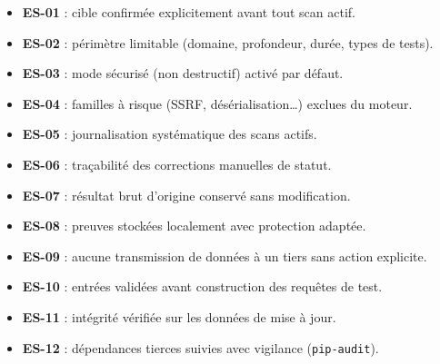 \documentclass[11pt,a4paper]{report}
\newcommand{\code}[1]{\texttt{#1}}
\begin{document}
\begin{itemize}[leftmargin=1.5em]
  \item \textbf{ES-01} : cible confirmée explicitement avant tout scan actif.
  \item \textbf{ES-02} : périmètre limitable (domaine, profondeur, durée, types de tests).
  \item \textbf{ES-03} : mode sécurisé (non destructif) activé par défaut.
  \item \textbf{ES-04} : familles à risque (SSRF, désérialisation\ldots) exclues du moteur.
  \item \textbf{ES-05} : journalisation systématique des scans actifs.
  \item \textbf{ES-06} : traçabilité des corrections manuelles de statut.
  \item \textbf{ES-07} : résultat brut d'origine conservé sans modification.
  \item \textbf{ES-08} : preuves stockées localement avec protection adaptée.
  \item \textbf{ES-09} : aucune transmission de données à un tiers sans action explicite.
  \item \textbf{ES-10} : entrées validées avant construction des requêtes de test.
  \item \textbf{ES-11} : intégrité vérifiée sur les données de mise à jour.
  \item \textbf{ES-12} : dépendances tierces suivies avec vigilance (\code{pip-audit}).
\end{itemize}
\end{document}
